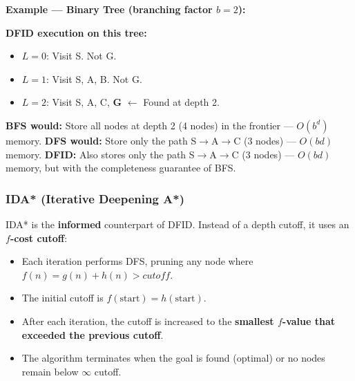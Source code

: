 \documentclass[12pt, a4paper]{article}
\newcommand{\node}[1]{\textbf{#1}}
\begin{document}
\noindent\textbf{Example — Binary Tree (branching factor $b=2$):}

\begin{center}
\end{center}

\vspace{0.3em}
\noindent\textbf{DFID execution on this tree:}
\begin{itemize}[noitemsep]
  \item $L{=}0$: Visit S. Not G.
  \item $L{=}1$: Visit S, A, B. Not G.
  \item $L{=}2$: Visit S, A, C, \textbf{G} $\leftarrow$ Found at depth 2.
\end{itemize}

\noindent\textbf{BFS would:} Store all nodes at depth 2 (4 nodes) in the frontier — $O(b^d)$ memory.
\textbf{DFS would:} Store only the path S$\to$A$\to$C (3 nodes) — $O(bd)$ memory.
\textbf{DFID:} Also stores only the path S$\to$A$\to$C (3 nodes) — $O(bd)$ memory, but with the completeness guarantee of BFS.

\subsubsection*{IDA* (Iterative Deepening A*)}

IDA* is the \textbf{informed} counterpart of DFID. Instead of a depth cutoff, it uses an \textbf{$f$-cost cutoff}:
\begin{itemize}[noitemsep]
  \item Each iteration performs DFS, pruning any node where $f(n) = g(n) + h(n) > \textit{cutoff}$.
  \item The initial cutoff is $f(\text{start}) = h(\text{start})$.
  \item After each iteration, the cutoff is increased to the \textbf{smallest $f$-value that exceeded the previous cutoff}.
  \item The algorithm terminates when the goal is found (optimal) or no nodes remain below $\infty$ cutoff.
\end{itemize}
\end{document}
